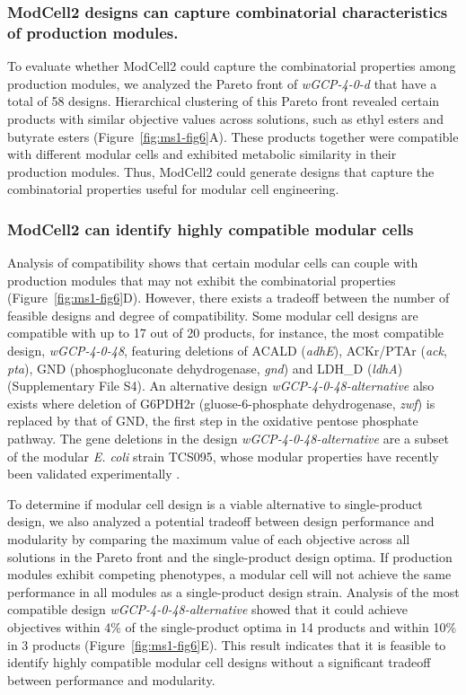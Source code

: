 \subsubsection{ModCell2 designs can capture combinatorial characteristics
of production modules.} To evaluate whether ModCell2 could capture the
combinatorial properties among production modules, we analyzed the
Pareto front of \emph{wGCP-4-0-d} that have a total of 58 designs.
Hierarchical clustering of this Pareto front revealed certain products
with similar objective values across solutions, such as ethyl esters and
butyrate esters (Figure~\ref{fig:ms1-fig6}A). These products together were compatible
with different modular cells and exhibited metabolic similarity in their
production modules. Thus, ModCell2 could generate designs that capture
the combinatorial properties useful for modular cell engineering.

\subsubsection{ModCell2 can identify highly compatible modular cells}
Analysis of compatibility shows that certain modular cells can couple
with production modules that may not exhibit the combinatorial
properties (Figure~\ref{fig:ms1-fig6}D). However, there exists a tradeoff between the
number of feasible designs and degree of compatibility. Some modular
cell designs are compatible with up to 17 out of 20 products, for
instance, the most compatible design, \emph{wGCP-4-0-48}, featuring
deletions of ACALD (\emph{adhE}), ACKr/PTAr (\emph{ack}, \emph{pta}),
GND (phosphogluconate dehydrogenase, \emph{gnd}) and LDH\_D
(\emph{ldhA}) (Supplementary File S4). An alternative design
\emph{wGCP-4-0-48-alternative} also exists where deletion of G6PDH2r
(gluose-6-phosphate dehydrogenase, \emph{zwf}) is replaced by that of
GND, the first step in the oxidative pentose phosphate pathway. The gene
deletions in the design \emph{wGCP-4-0-48-alternative} are a subset of
the modular \emph{E. coli} strain TCS095, whose modular properties have
recently been validated experimentally \citep{wilbanks2017}.

To determine if modular cell design is a viable alternative to single-product design, we also analyzed a potential tradeoff between design performance and modularity by comparing the maximum value of each objective across all solutions in the Pareto front and the single-product design optima.
If production modules exhibit competing phenotypes, a modular cell will not achieve the same performance in all modules as a single-product design strain.
Analysis of the most compatible design \emph{wGCP-4-0-48-alternative} showed that it could achieve objectives within 4\% of the single-product optima in 14 products and within 10\% in 3 products (Figure~\ref{fig:ms1-fig6}E).
This result indicates that it is feasible to identify highly compatible modular cell designs without a significant tradeoff between performance and modularity.

